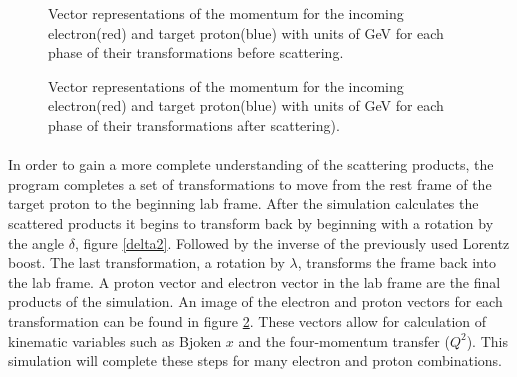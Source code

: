 \begin{figure}[p!]

  \centering
  
  \quad
  \centering
  \vspace{0.25cm}
  \centering
  \quad
  \centering
   \vspace{0.25cm} 
  \caption{Vector representations of the momentum for the incoming electron(red) and  target proton(blue) with units of GeV for each phase of their transformations before scattering.}
  \label{transform}
  \end{figure}
  \begin{figure}[p!]
	\centering
	\quad
	\centering
	\vspace{0.25cm}
	\centering
	\quad
	\centering
	\vspace{0.25cm}	
	\caption{Vector representations of the momentum for the incoming electron(red) and  target proton(blue) with units of GeV for each phase of their transformations after scattering).}
	\label{transform2}
\end{figure}

  \paragraph{}
  In order to gain a more complete understanding of the scattering products, the program completes a set of transformations to move from the rest frame of the target proton to the beginning lab frame. After the simulation calculates the scattered products it begins to transform back by beginning with a rotation by the angle $\delta$, figure \ref{delta2}. Followed by the inverse of the previously used Lorentz boost. The last transformation, a rotation by $\lambda$, transforms the frame back into the lab frame. A proton vector and electron vector in the lab frame are the final products of the simulation. An image of the electron and proton vectors for each transformation can be found in figure \ref{transform2}. These vectors allow for calculation of kinematic variables such as Bjoken $x$ and the four-momentum transfer ($Q^2$).  This simulation will complete these steps for many electron and proton combinations.



